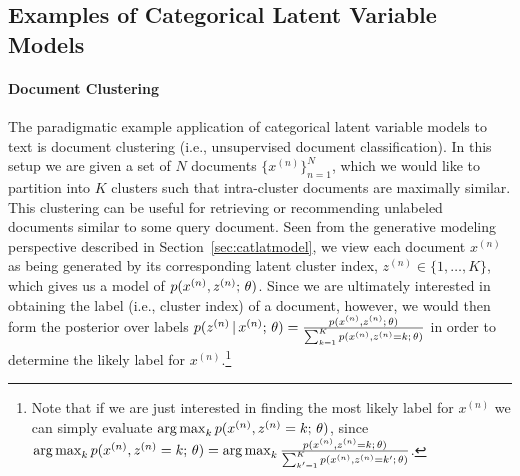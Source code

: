 \documentclass{article}
\begin{document}

\subsection{Examples of Categorical Latent Variable Models}
\paragraph{Document Clustering} The paradigmatic example application of categorical latent variable models to text is document clustering (i.e., unsupervised document classification). In this setup we are given a set of $N$ documents $\{x^{(n)}\}_{n=1}^N$, which we would like to partition into $K$ clusters such that intra-cluster documents are maximally similar. This clustering can be useful for retrieving or recommending unlabeled documents similar to some query document. Seen from the generative modeling perspective described in Section~\ref{sec:catlatmodel}, we view each document $x^{(n)}$ as being generated by its corresponding latent cluster index, $z^{(n)} \in \{1, \ldots, K\}$, which gives us a model of $p(x^{(n)}, z^{(n)} ; \, \theta)$. Since we are ultimately interested in obtaining the label (i.e., cluster index) of a document, however, we would then form the posterior over labels $p(z^{(n)} \,|\, x^{(n)} ; \, \theta) = \frac{p(x^{(n)}, z^{(n)} ; \, \theta)}{\sum_{k=1}^K p(x^{(n)}, z^{(n)}=k ; \, \theta)}$ in order to determine the likely label for $x^{(n)}$.\footnote{Note that if we are just interested in finding the most likely label for $x^{(n)}$ we can simply evaluate $\argmax_k p(x^{(n)}, z^{(n)}=k \param \theta)$, since $\argmax_k p(x^{(n)}, z^{(n)}=k \param \theta) = \argmax_k \frac{p(x^{(n)}, z^{(n)} = k \param \theta)}{\sum_{k'=1}^K p(x^{(n)}, z^{(n)}=k' \param \theta)}$.}
\end{document}
